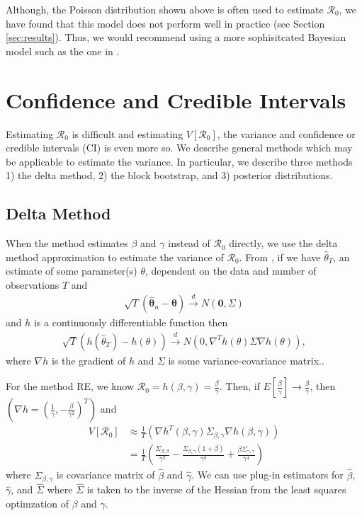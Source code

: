 \documentclass[12pt]{article}
\newcommand{\rr}{\ensuremath{\mathcal{R}_0}}
\begin{document}
Although, the Poisson distribution shown above is often used to estimate $\rr$, we have found that this model does not perform well in practice (see Section \ref{sec:results}).  Thus, we would recommend using a more sophisitcated Bayesian model such as the one in \cite{bauer2017}.


\section{Confidence and Credible Intervals}
\label{sec:ci}

Estimating $\rr$ is difficult and estimating $V[\rr]$, the variance and confidence or credible intervals (CI) is even more so.  We describe general methods which may be applicable to estimate the variance.  In particular, we describe three methods 1) the delta method, 2) the block bootstrap, and 3) posterior distributions.




\subsection{Delta Method}\label{delta-method}

When the method estimates \(\beta\) and \(\gamma\) instead of \(\rr\) directly, we use the delta method approximation to estimate the
variance of \(\rr\).   From \cite{wasserman2004}, if we have $\hat{\theta}_T$, an estimate of some parameter(s) $\theta$, dependent on the data and number of observations $T$ and
\begin{align*}
  \sqrt{T} \left ( \hat{\mathbf{\theta}}_n - \mathbf{\theta} \right ) \overset{d}{\to} N\left ( \mathbf{0}, \Sigma \right  )
\end{align*}
and $h$ is a continuously differentiable function then
\begin{align*}
  \sqrt{T} \left (h(\hat{\theta}_T) - h(\theta) \right ) \overset{d}{\to} N \left (0,  \nabla^T h(\theta)\Sigma \nabla h(\theta)\right ),
\end{align*}
where $\nabla h$ is the gradient of $h$ and $\Sigma$ is some variance-covariance matrix..

For the method RE, we know $\rr = h(\beta, \gamma) = \frac{\beta}{\gamma}$. Then, if $E\left [\frac{\hat{\beta}}{\hat{\gamma}}\right] \to \frac{\beta}{\gamma}$, then  $(\nabla h = (\frac{1}{\gamma},  -\frac{\beta}{\gamma^2})^T)$ and
\begin{align*}
  V[\rr] &\approx \frac{1}{T} \left ( \nabla h^T(\beta, \gamma) \Sigma_{\beta, \gamma} \nabla h(\beta, \gamma) \right ) \\
  &= \frac{1}{T} \left ( \frac{\Sigma_{\beta, \beta}}{\gamma^2} - \frac{\Sigma_{\beta, \gamma}(1 + \beta)}{\gamma^3} + \frac{\beta \Sigma_{\gamma, \gamma}}{\gamma^4} \right )
\end{align*}
where $\Sigma_{\beta, \gamma}$ is covariance matrix of $\hat{\beta}$ and $\hat{\gamma}$.  We can use plug-in estimators for $\hat{\beta}$, $\hat{\gamma}$, and $\hat{\Sigma}$ where $\hat{\Sigma}$ is taken to the inverse of the Hessian from the least squares optimzation of $\beta$ and $\gamma$.
\end{document}
